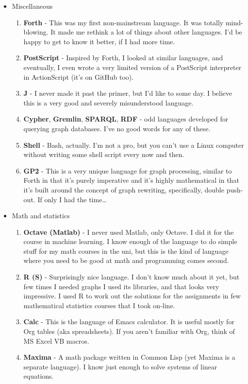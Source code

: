\documentclass[oneside]{memoir}
\begin{document}
\begin{itemize}
\item Miscellaneous
\begin{enumerate}
\item \textbf{Forth} - This was my first non-mainstream language.  It was totally
mind-blowing.  It made me rethink a lot of things about other languages.
I'd be happy to get to know it better, if I had more time.
\item \textbf{PostScript} - Inspired by Forth, I looked at similar languages, and
eventually, I even wrote a very limited version of a PostScript
interpreter in ActionScript (it's on GitHub too).
\item \textbf{J} - I never made it past the primer, but I'd like to some day.  I 
believe this is a very good and severely misunderstood language.
\item \textbf{Cypher}, \textbf{Gremlin}, \textbf{SPARQL}, \textbf{RDF} - odd languages developed for
querying graph databases.  I've no good words for any of these.
\item \textbf{Shell} - Bash, actually. I'm not a pro, but you can't use a Linux
computer without writing some shell script every now and then.
\item \textbf{GP2} - This is a very unique language for graph processing, similar
to Forth in that it's purely imperative and it's highly mathematical
in that it's built around the concept of graph rewriting, specifically,
double push-out.  If only I had the time\ldots{}
\end{enumerate}

\item Math and statistics
\begin{enumerate}
\item \textbf{Octave (Matlab)} - I never used Matlab, only Octave.  I did it for the
course in machine learning.  I know enough of the language to do simple
stuff for my math courses in the uni, but this is the kind of language
where you need to be good at math and programming comes second.
\item \textbf{R (S)} - Surprisingly nice language.  I don't know much about it yet, but
few times I needed graphs I used its libraries, and that looks very
impressive.  I used R to work out the solutions for the assignments in
few mathematical statistics courses that I took on-line.
\item \textbf{Calc} - This is the language of Emacs calculator.  It is useful mostly
for Org tables (aka spreadsheets).  If you aren't familiar with Org,
think of MS Excel VB macros.
\item \textbf{Maxima} - A math package written in Common Lisp (yet Maxima is a 
separate language).  I know just enough to solve systems of linear
equations.
\end{enumerate}


\end{itemize}
\end{document}
